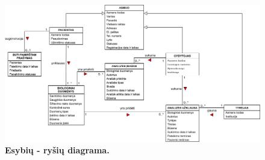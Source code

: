 \documentclass[12pt]{article}
\begin{document}
\begin{figure}[ht]
    \begin{center}
        \captionsetup{justification=centering}
        \includegraphics[width=1.05\linewidth]{ER.png}
        \vspace{-1\baselineskip}
        \caption{\small\textbf{Esybių - ryšių diagrama.}}
        \label{fig:image3}
    \end{center}
\end{figure}

\newpage
\end{document}
